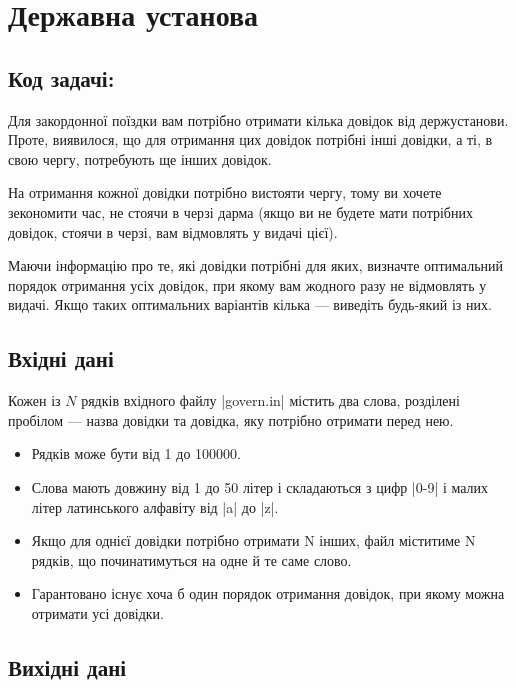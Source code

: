 \documentclass[12pt,a4paper]{article}
\begin{document}
\section*{Державна установа \hfill {}}


\subsection*{Код задачі: }

Для закордонної поїздки вам потрібно отримати кілька довідок від держустанови. Проте, виявилося, що для отримання цих довідок потрібні інші довідки, а ті, в свою чергу, потребують ще інших довідок.

На отримання кожної довідки потрібно вистояти чергу, тому ви хочете зекономити час, не стоячи в черзі дарма (якщо ви не будете мати потрібних довідок, стоячи в черзі, вам відмовлять у видачі цієї).

Маючи інформацію про те, які довідки потрібні для яких, визначте оптимальний порядок отримання усіх довідок, при якому вам жодного разу не відмовлять у видачі. Якщо таких оптимальних варіантів кілька --- виведіть будь-який із них.


\subsection*{Вхідні дані}

Кожен із \(N\) рядків вхідного файлу |govern.in| містить два слова, розділені пробілом --- назва довідки та довідка, яку потрібно отримати перед нею.

\begin{itemize}
    \item Рядків може бути від 1 до 100000.
    \item Слова мають довжину від 1 до 50 літер і складаються з цифр |0-9| і малих літер латинського алфавіту від |a| до |z|.
    \item Якщо для однієї довідки потрібно отримати N інших, файл міститиме N рядків, що починатимуться на одне й те саме слово.
    \item Гарантовано існує хоча б один порядок отримання довідок, при якому можна отримати усі довідки.
\end{itemize}


\subsection*{Вихідні дані}
\end{document}
